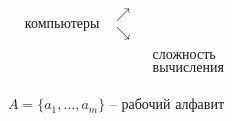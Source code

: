 \begin{note}[История]
\[\begin{array}{ccccc}
                                                                       &             & \boxed{\text{компьютеры}} & \begin{matrix}
                                                                                                                       \nearrow \\ \searrow
                                                                                                                   \end{matrix} &                            \\
                                                                       &             &                           &                      & \boxed{\begin{array}{c}
                                                                                                                                                         \text{сложность} \\
                                                                                                                                                         \text{вычисления}
                                                                                                                                                     \end{array}} \\
        \end{array}
    \]
\end{note}

\begin{note}
    \[
        A = \{a_1,\ldots,a_m\} \text{ -- рабочий алфавит}
    \]
\end{note}

